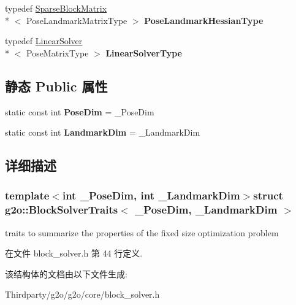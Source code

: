 \begin{DoxyCompactItemize}
\item 
\hypertarget{structg2o_1_1BlockSolverTraits_af8ef27915a056caae3b12a9ca609eba6}{typedef \hyperlink{classg2o_1_1SparseBlockMatrix}{Sparse\-Block\-Matrix}\\*
$<$ Pose\-Landmark\-Matrix\-Type $>$ {\bfseries Pose\-Landmark\-Hessian\-Type}}\label{structg2o_1_1BlockSolverTraits_af8ef27915a056caae3b12a9ca609eba6}

\item 
\hypertarget{structg2o_1_1BlockSolverTraits_add6edae08cb0665c2b1e7c641cdb4dc4}{typedef \hyperlink{classg2o_1_1LinearSolver}{Linear\-Solver}\\*
$<$ Pose\-Matrix\-Type $>$ {\bfseries Linear\-Solver\-Type}}\label{structg2o_1_1BlockSolverTraits_add6edae08cb0665c2b1e7c641cdb4dc4}

\end{DoxyCompactItemize}
\subsection*{静态 Public 属性}
\begin{DoxyCompactItemize}
\item 
\hypertarget{structg2o_1_1BlockSolverTraits_a90a03bcfc60b629da5601f6df9514297}{static const int {\bfseries Pose\-Dim} = \-\_\-\-Pose\-Dim}\label{structg2o_1_1BlockSolverTraits_a90a03bcfc60b629da5601f6df9514297}

\item 
\hypertarget{structg2o_1_1BlockSolverTraits_a7e6e33971e5243e020a9f41cd3182218}{static const int {\bfseries Landmark\-Dim} = \-\_\-\-Landmark\-Dim}\label{structg2o_1_1BlockSolverTraits_a7e6e33971e5243e020a9f41cd3182218}

\end{DoxyCompactItemize}


\subsection{详细描述}
\subsubsection*{template$<$int \-\_\-\-Pose\-Dim, int \-\_\-\-Landmark\-Dim$>$struct g2o\-::\-Block\-Solver\-Traits$<$ \-\_\-\-Pose\-Dim, \-\_\-\-Landmark\-Dim $>$}

traits to summarize the properties of the fixed size optimization problem 

在文件 block\-\_\-solver.\-h 第 44 行定义.



该结构体的文档由以下文件生成\-:\begin{DoxyCompactItemize}
\item 
Thirdparty/g2o/g2o/core/block\-\_\-solver.\-h\end{DoxyCompactItemize}
